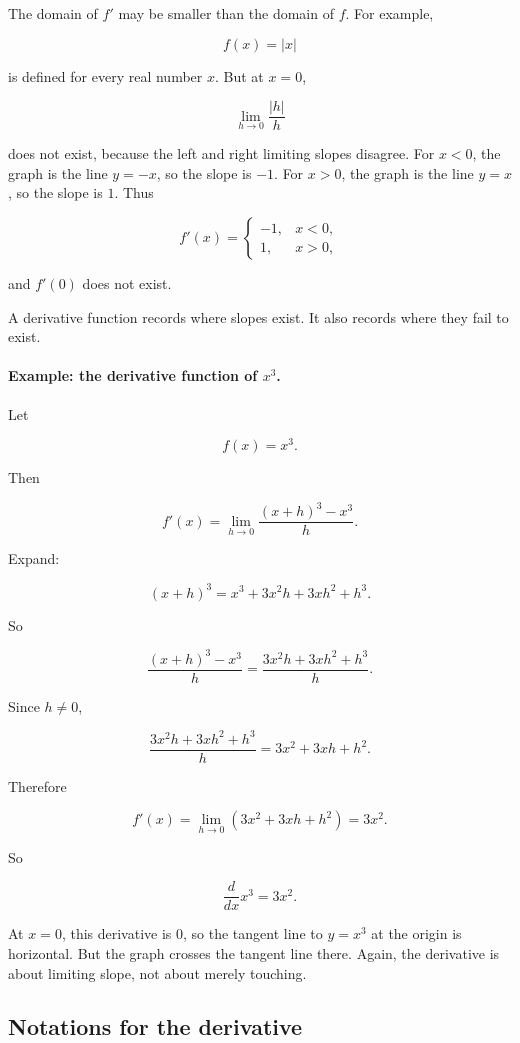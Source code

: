 The domain of \(f'\) may be smaller than the domain of \(f\).  For example,

\[
f(x)=|x|
\]

is defined for every real number \(x\).  But at \(x=0\),

\[
\lim_{h\to0}\frac{|h|}{h}
\]

does not exist, because the left and right limiting slopes disagree.  For \(x<0\), the graph is the line \(y=-x\), so the slope is \(-1\).  For \(x>0\), the graph is the line \(y=x\), so the slope is \(1\).  Thus

\[
f'(x)=
\begin{cases}
-1, & x<0,\\
1, & x>0,
\end{cases}
\]

and \(f'(0)\) does not exist.

A derivative function records where slopes exist.  It also records where they fail to exist.

\paragraph{Example: the derivative function of \(x^3\).}
Let

\[
f(x)=x^3.
\]

Then

\[
f'(x)
=
\lim_{h\to0}\frac{(x+h)^3-x^3}{h}.
\]

Expand:

\[
(x+h)^3=x^3+3x^2h+3xh^2+h^3.
\]

So

\[
\frac{(x+h)^3-x^3}{h}
=
\frac{3x^2h+3xh^2+h^3}{h}.
\]

Since \(h\neq0\),

\[
\frac{3x^2h+3xh^2+h^3}{h}
=
3x^2+3xh+h^2.
\]

Therefore

\[
f'(x)
=
\lim_{h\to0}(3x^2+3xh+h^2)
=
3x^2.
\]

So

\[
\boxed{\frac{d}{dx}x^3=3x^2.}
\]

At \(x=0\), this derivative is \(0\), so the tangent line to \(y=x^3\) at the origin is horizontal.  But the graph crosses the tangent line there.  Again, the derivative is about limiting slope, not about merely touching.

\subsection{Notations for the derivative}
\label{subsec:derivative-notations}

